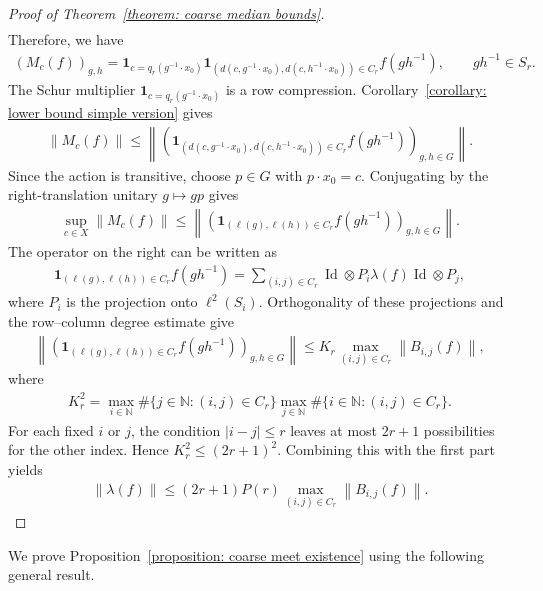 \documentclass[12pt,reqno]{amsart}
\newcommand{\N}{\mathbb{N}}
\newcommand{\norm}[1]{\left\|#1\right\|}
\newcommand{\Id}{\operatorname{Id}}
\numberwithin{equation}{section}
\begin{document}
\begin{proof}[Proof of Theorem~\ref{theorem: coarse median bounds}]
\begin{align*}
    \end{align*}
    Therefore, we have
    \begin{align*}
        (M_{c}(f))_{g,h}= \mathbf{1}_{c=q_r(g^{-1}\cdot x_0)}\mathbf{1}_{(d(c,g^{-1}\cdot x_0),d(c,h^{-1}\cdot x_0))\in C_r}f(gh^{-1}),\qquad gh^{-1}\in S_r.
    \end{align*}
    The Schur multiplier $\mathbf{1}_{c=q_r(g^{-1}\cdot x_0)}$ is a row compression. Corollary~\ref{corollary: lower bound simple version} gives
    \begin{align*}
        \norm{M_c(f)}\le \norm{\left(\mathbf{1}_{(d(c,g^{-1}\cdot x_0),d(c,h^{-1}\cdot x_0))\in C_r}f(gh^{-1})\right)_{g,h\in G}}.
    \end{align*}
    Since the action is transitive, choose $p\in G$ with $p\cdot x_0=c$. Conjugating by the right-translation unitary $g\mapsto gp$ gives
    \begin{align*}
          \sup_{c\in X}\norm{M_c(f)}\le \norm{\left(\mathbf{1}_{(\ell(g),\ell(h))\in C_r}f(gh^{-1})\right)_{g,h\in G}}.
    \end{align*}
    The operator on the right can be written as
    \begin{align*}
        \mathbf{1}_{(\ell(g),\ell(h))\in C_r}f(gh^{-1})=\sum_{(i,j)\in C_r} \Id\otimes P_{i}\lambda(f) \Id\otimes P_{j},
    \end{align*}
    where $P_i$ is the projection onto $\ell^2(S_i)$. Orthogonality of these projections and the row--column degree estimate give
    \begin{align*}
        \norm{\left(\mathbf{1}_{(\ell(g),\ell(h))\in C_r}f(gh^{-1})\right)_{g,h\in G}}\le K_r\max_{(i,j)\in C_r}\norm{B_{i,j}(f)},
    \end{align*}
    where
    \begin{align*}
        K_r^2=\max_{i\in \N}\#\{j\in \N:(i,j)\in C_r\} \max_{j\in \N}\#\{i\in \N:(i,j)\in C_r\}.
    \end{align*}
    For each fixed $i$ or $j$, the condition $|i-j|\le r$ leaves at most $2r+1$ possibilities for the other index. Hence $K_r^2\le(2r+1)^2$. Combining this with the first part yields
    \begin{align*}
        \norm{\lambda(f)}\le (2r+1)P(r)\max_{(i,j)\in C_r}\norm{B_{i,j}(f)}.
    \end{align*}
\end{proof}
We prove Proposition~\ref{proposition: coarse meet existence} using the following general result.
\end{document}

